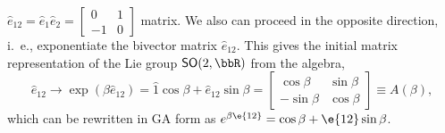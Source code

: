 \begin{example}
$\hat{e}_{12}=\hat{e}_{1}\hat{e}_{2}=\left[\begin{smallmatrix}0&1\\-1&0\end{smallmatrix}\right]$ matrix.
We also can proceed in the opposite direction, i.~e., exponentiate
the bivector matrix $\hat{e}_{12}$. This gives the initial matrix
representation of the Lie group $\mathsf{SO}(2,\bbR)$ from the
algebra,
\[\hat{e}_{12}\rightarrow\exp{(\beta\hat{e}_{12})}=\hat{1}\cos\beta+\hat{e}_{12}\sin\beta=
\begin{bmatrix}\cos\beta&\sin\beta\\-\sin\beta&\cos\beta\end{bmatrix}\equiv
A(\beta),\] which can be rewritten in GA form as
$e^{\beta\e{12}}=\cos{\beta}+\e{12}\sin\beta$.
\end{example}
%
